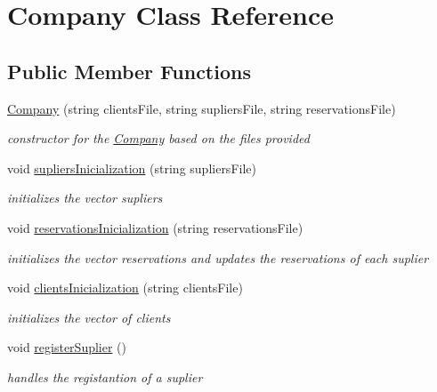 \hypertarget{class_company}{}\section{Company Class Reference}
\label{class_company}
\subsection*{Public Member Functions}
\begin{DoxyCompactItemize}
\item 
\hyperlink{class_company_a50772131ed5edbbcb73bf58dfec71c72}{Company} (string clients\+File, string supliers\+File, string reservations\+File)
\begin{DoxyCompactList}\small\item\em constructor for the \hyperlink{class_company}{Company} based on the files provided \end{DoxyCompactList}\item 
void \hyperlink{class_company_a5a3e5d5ef3ef991c54de2781d0607c19}{supliers\+Inicialization} (string supliers\+File)
\begin{DoxyCompactList}\small\item\em initializes the vector supliers \end{DoxyCompactList}\item 
void \hyperlink{class_company_a79bf900155922f7d8b8b1f248dcc3313}{reservations\+Inicialization} (string reservations\+File)
\begin{DoxyCompactList}\small\item\em initializes the vector reservations and updates the reservations of each suplier \end{DoxyCompactList}\item 
void \hyperlink{class_company_ae2767e861cbe5ddec7111c2d04878c9f}{clients\+Inicialization} (string clients\+File)
\begin{DoxyCompactList}\small\item\em initializes the vector of clients \end{DoxyCompactList}\item 
\hypertarget{class_company_af124ca1bb17d8450ab129a33a5f8d4be}{}\label{class_company_af124ca1bb17d8450ab129a33a5f8d4be} 
void \hyperlink{class_company_af124ca1bb17d8450ab129a33a5f8d4be}{register\+Suplier} ()
\begin{DoxyCompactList}\small\item\em handles the registantion of a suplier \end{DoxyCompactList}\item 

\end{DoxyCompactItemize}
